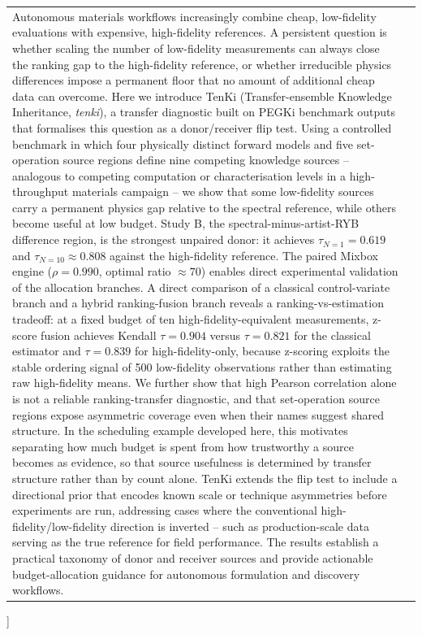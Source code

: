\documentclass[twoside,twocolumn,9pt]{article}
\begin{document}
\begin{@twocolumnfalse}
\begin{tabular}{m{4.5cm} p{13.5cm}}
{Autonomous materials workflows increasingly combine cheap, low-fidelity evaluations with expensive, high-fidelity references. A persistent question is whether scaling the number of low-fidelity measurements can always close the ranking gap to the high-fidelity reference, or whether irreducible physics differences impose a permanent floor that no amount of additional cheap data can overcome. Here we introduce TenKi (Transfer-ensemble Knowledge Inheritance, \textit{tenki}), a transfer diagnostic built on PEGKi benchmark outputs that formalises this question as a donor/receiver flip test. Using a controlled benchmark in which four physically distinct forward models and five set-operation source regions define nine competing knowledge sources -- analogous to competing computation or characterisation levels in a high-throughput materials campaign -- we show that some low-fidelity sources carry a permanent physics gap relative to the spectral reference, while others become useful at low budget. Study B, the spectral-minus-artist-RYB difference region, is the strongest unpaired donor: it achieves $\tau_{N=1}=0.619$ and $\tau_{N=10}\approx0.808$ against the high-fidelity reference. The paired Mixbox engine ($\rho = 0.990$, optimal ratio $\approx 70$) enables direct experimental validation of the allocation branches. A direct comparison of a classical control-variate branch and a hybrid ranking-fusion branch reveals a ranking-vs-estimation tradeoff: at a fixed budget of ten high-fidelity-equivalent measurements, z-score fusion achieves Kendall $\tau = 0.904$ versus $\tau = 0.821$ for the classical estimator and $\tau = 0.839$ for high-fidelity-only, because z-scoring exploits the stable ordering signal of 500 low-fidelity observations rather than estimating raw high-fidelity means. We further show that high Pearson correlation alone is not a reliable ranking-transfer diagnostic, and that set-operation source regions expose asymmetric coverage even when their names suggest shared structure. In the scheduling example developed here, this motivates separating how much budget is spent from how trustworthy a source becomes as evidence, so that source usefulness is determined by transfer structure rather than by count alone. TenKi extends the flip test to include a directional prior that encodes known scale or technique asymmetries before experiments are run, addressing cases where the conventional high-fidelity/low-fidelity direction is inverted -- such as production-scale data serving as the true reference for field performance. The results establish a practical taxonomy of donor and receiver sources and provide actionable budget-allocation guidance for autonomous formulation and discovery workflows.%
} \\
\end{tabular}
\end{@twocolumnfalse}\vspace{0.6cm}
]
\end{document}
